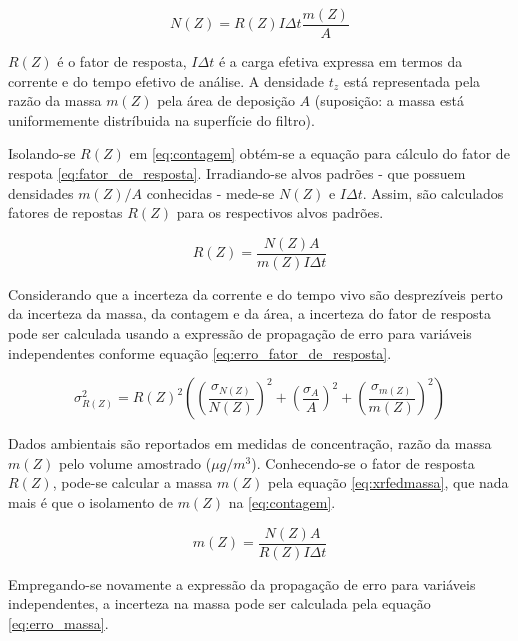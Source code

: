 \begin{equation}
  \label{eq:contagem}
  N(Z) = R(Z) I\Delta t \frac{m(Z)}{A}
\end{equation}

$R(Z)$ é o fator de resposta, $I\Delta t$ é a carga efetiva expressa
em termos da corrente e do tempo efetivo de análise.
A densidade $t_z$ está representada pela razão da massa $m(Z)$ pela 
área de deposição $A$ (suposição: a massa está uniformemente distríbuida 
na superfície do filtro).

Isolando-se $R(Z)$ em \ref{eq:contagem} obtém-se a equação para cálculo 
do fator de respota \ref{eq:fator_de_resposta}.
Irradiando-se alvos padrões - que possuem densidades $m(Z)/A$ conhecidas - 
mede-se $N(Z)$ e $I \Delta t$. Assim, são calculados fatores de repostas $R(Z)$ 
para os respectivos alvos padrões. 

\begin{equation}
  \label{eq:fator_de_resposta}
  R(Z) = \frac{N(Z) A}{m(Z)I \Delta t}
\end{equation}

Considerando que a incerteza da corrente e do tempo vivo são
desprezíveis perto da incerteza da massa, da contagem e da área, 
a incerteza do fator de resposta pode ser calculada usando a expressão
de propagação de erro para variáveis independentes conforme equação 
\ref{eq:erro_fator_de_resposta}.

\begin{equation}
  \label{eq:erro_fator_de_resposta}
  \sigma_{R(Z)}^2 = {R(Z)}^2 \left( \left(\frac{\sigma_{N(Z)}}{N(Z)}\right)^2 + 
                                  \left(\frac{\sigma_A}{A}\right)^2 + 
                                  \left(\frac{\sigma_{m(Z)}}{m(Z)}\right)^2 
                             \right)
\end{equation}

Dados ambientais são reportados em medidas de concentração,
razão da massa $m(Z)$ pelo volume amostrado ($\mu g/m^3$).
Conhecendo-se o fator de resposta $R(Z)$, pode-se calcular a massa $m(Z)$ 
pela equação \ref{eq:xrfedmassa}, que nada mais é que o isolamento de $m(Z)$ na 
\ref{eq:contagem}. 

\begin{equation}
  \label{eq:xrfedmassa}
  m(Z) = \frac{N(Z) A}{ R(Z)I \Delta t}
\end{equation}

Empregando-se novamente a expressão da propagação de erro para variáveis independentes, 
a incerteza na massa pode ser calculada pela equação \ref{eq:erro_massa}.

